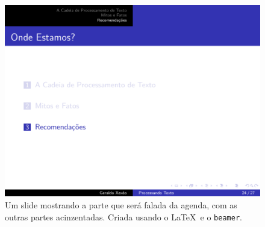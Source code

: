 \begin{figure}[hbt]
    \centering
    \includegraphics[width=\tam\linewidth,frame]{imagens/agendadomeio.png}
    \caption{Um slide mostrando a parte que será falada da agenda, com as outras partes acinzentadas. Criada usando o \LaTeX\  e o \texttt{beamer}.}
    \label{fig:meio}
\end{figure}




